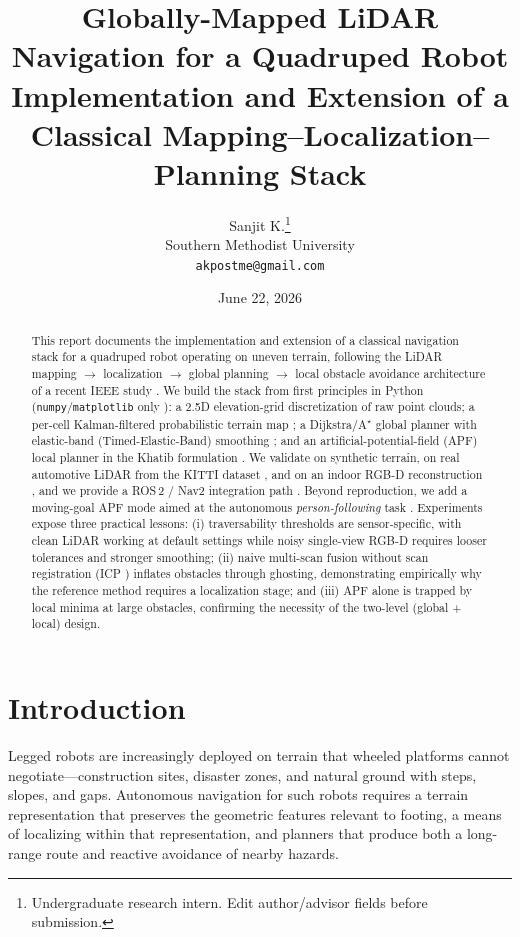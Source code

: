 \documentclass[11pt]{article}
\title{\textbf{Globally-Mapped LiDAR Navigation for a Quadruped Robot}\\[2pt]
\large Implementation and Extension of a Classical
Mapping--Localization--Planning Stack}
\author{Sanjit K.\thanks{Undergraduate research intern. Edit author/advisor
fields before submission.}\\
\small Southern Methodist University\\
\small \texttt{akpostme@gmail.com}}
\date{June 22, 2026}
\begin{document}
\maketitle

\begin{abstract}
\noindent
This report documents the implementation and extension of a classical navigation
stack for a quadruped robot operating on uneven terrain, following the
LiDAR mapping $\rightarrow$ localization $\rightarrow$ global planning
$\rightarrow$ local obstacle avoidance architecture of a recent IEEE study
\cite{refpaper}. We build the stack from first principles in Python
(\texttt{numpy}/\texttt{matplotlib} only \cite{harris2020,hunter2007}): a 2.5D
elevation-grid discretization of raw point clouds; a per-cell Kalman-filtered
probabilistic terrain map \cite{kalman1960,fankhauser2018}; a Dijkstra/A$^\star$
global planner \cite{dijkstra1959,hart1968} with elastic-band (Timed-Elastic-Band)
smoothing \cite{rosmann2017}; and an artificial-potential-field (APF) local
planner in the Khatib formulation \cite{khatib1986}. We validate on synthetic
terrain, on real automotive LiDAR from the KITTI dataset \cite{geiger2013}, and on
an indoor RGB-D reconstruction \cite{zhou2018}, and we provide a ROS\,2 / Nav2
integration path \cite{macenski2020,macenski2022}. Beyond reproduction, we add a
moving-goal APF mode aimed at the autonomous \emph{person-following} task
\cite{islam2019}. Experiments expose three practical lessons: (i) traversability
thresholds are sensor-specific, with clean LiDAR working at default settings while
noisy single-view RGB-D requires looser tolerances and stronger smoothing; (ii)
naive multi-scan fusion without scan registration (ICP \cite{besl1992}) inflates
obstacles through ghosting, demonstrating empirically why the reference method
requires a localization stage; and (iii) APF alone is trapped by local minima at
large obstacles, confirming the necessity of the two-level (global + local)
design.
\end{abstract}

\section{Introduction}
\label{sec:intro}

Legged robots are increasingly deployed on terrain that wheeled platforms cannot
negotiate---construction sites, disaster zones, and natural ground with steps,
slopes, and gaps. Autonomous navigation for such robots requires a terrain
representation that preserves the geometric features relevant to footing, a means
of localizing within that representation, and planners that produce both a
long-range route and reactive avoidance of nearby hazards.
\end{document}
